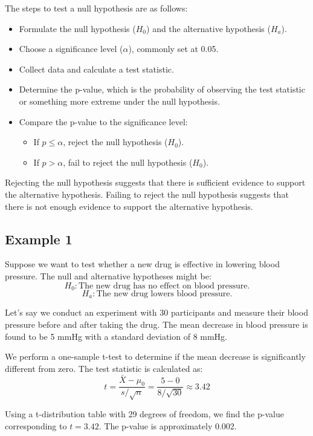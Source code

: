 \documentclass{article}
\begin{document}
The steps to test a null hypothesis are as follows:
\begin{itemize}
    \item Formulate the null hypothesis (\(H_0\)) and the alternative hypothesis (\(H_a\)).
    \item Choose a significance level (\(\alpha\)), commonly set at 0.05.
    \item Collect data and calculate a test statistic.
    \item Determine the p-value, which is the probability of observing the test statistic or something more extreme under the null hypothesis.
    \item Compare the p-value to the significance level:
    \begin{itemize}
        \item If \(p \leq \alpha\), reject the null hypothesis (\(H_0\)).
        \item If \(p > \alpha\), fail to reject the null hypothesis (\(H_0\)).
    \end{itemize}
\end{itemize}

Rejecting the null hypothesis suggests that there is sufficient evidence to support the alternative hypothesis. Failing to reject the null hypothesis suggests that there is not enough evidence to support the alternative hypothesis.

\subsection{Example 1}
Suppose we want to test whether a new drug is effective in lowering blood pressure. The null and alternative hypotheses might be:
\[
H_0: \text{The new drug has no effect on blood pressure.}
\]
\[
H_a: \text{The new drug lowers blood pressure.}
\]

Let's say we conduct an experiment with 30 participants and measure their blood pressure before and after taking the drug. The mean decrease in blood pressure is found to be 5 mmHg with a standard deviation of 8 mmHg.

We perform a one-sample t-test to determine if the mean decrease is significantly different from zero. The test statistic is calculated as:
\[
t = \frac{\bar{X} - \mu_0}{s / \sqrt{n}} = \frac{5 - 0}{8 / \sqrt{30}} \approx 3.42
\]

Using a t-distribution table with 29 degrees of freedom, we find the p-value corresponding to \(t = 3.42\). The p-value is approximately 0.002.
\end{document}
